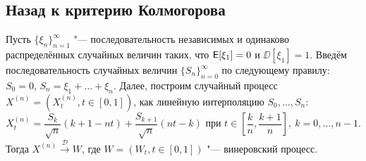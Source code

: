 \subsection{Назад к критерию Колмогорова}
\begin{theorem}
	Пусть $\{\xi_{n}\}_{n = 1}^{\infty}$ "--- последовательность независимых и одинаково распределённых случайных величин таких, что $\operatorname{\mathsf{E}}[\xi_{1}] = 0$ и $\DD[\xi_{1}] = 1$. Введём последовательность случайных величин $\{S_{n}\}_{n = 0}^{\infty}$ по следующему правилу: $S_{0} = 0$, $S_{n} = \xi_{1} + \ldots + \xi_{n}$. Далее, построим случайный процесс $X^{(n)} = (X^{(n)}_{t}, t \in [0, 1])$, как линейную интерполяцию $S_{0}, \ldots, S_{n}$:
	\begin{equation}
		X^{(n)}_{t} = \frac{S_{k}}{\sqrt{n}}(k + 1 - nt) + \frac{S_{k + 1}}{\sqrt{n}}(nt - k) \text{ при } t \in \left[\frac{k}{n}, \frac{k + 1}{n}\right],\ k = 0, \ldots, n - 1.
	\end{equation}
	Тогда $X^{(n)} \xrightarrow{\mathcal{D}} W$, где $W = (W_{t}, t \in [0, 1])$ "--- винеровский процесс.
\end{theorem}

